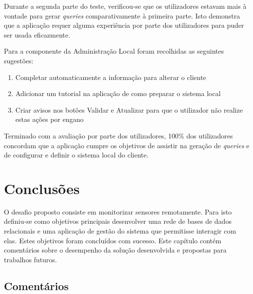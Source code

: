 \documentclass[11pt,twoside,a4paper]{report}
\begin{document}
Durante a segunda parte do teste, verificou-se que os utilizadores estavam mais à vontade para gerar \textit{queries} comparativamente à primeira parte. Isto demonstra que a aplicação requer alguma experiência por parte dos utilizadores para puder ser usada eficazmente.\par 
Para a componente da Administração Local foram recolhidas as seguintes sugestões:
\begin{enumerate}
	\item Completar automaticamente a informação para alterar o cliente
	\item Adicionar um tutorial na aplicação de como preparar o sistema local
	\item Criar avisos nos botões Validar e Atualizar para que o utilizador não realize estas ações por engano
\end{enumerate}
Terminado com a avaliação por parte dos utilizadores, 100\% dos utilizadores concordam que a aplicação cumpre os objetivos de assistir na geração de \textit{queries} e de configurar e definir o sistema local do cliente.

\cleardoublepage
\chapter{Conclusões}
\label{chap:conclusoes}
O desafio proposto consiste em monitorizar sensores remotamente. Para isto definiu-se como objetivos principais desenvolver uma rede de bases de dados relacionais e uma aplicação de gestão do sistema que permitisse interagir com elas. Estes objetivos foram concluídos com sucesso. Este capítulo contém comentários sobre o desempenho da solução desenvolvida e propostas para trabalhos futuros.

\section{Comentários}
\end{document}
